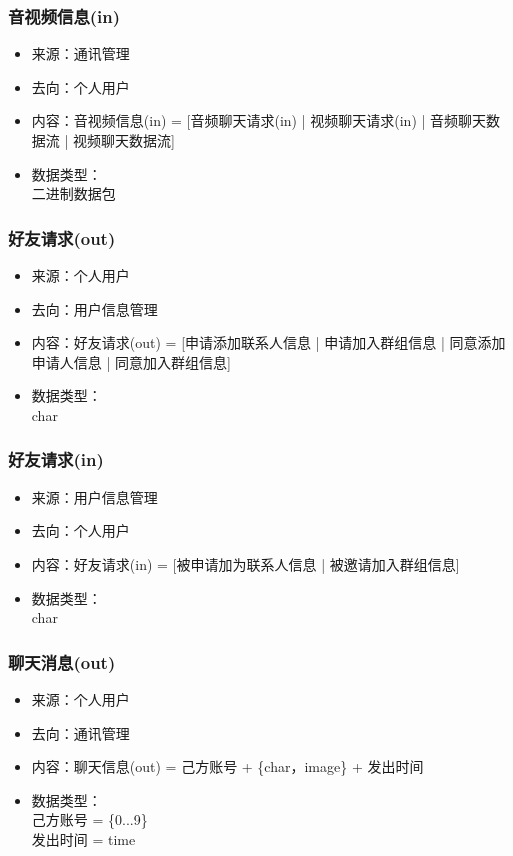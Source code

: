             \subsubsection{音视频信息(in)}
            \begin{itemize}
                    \item 来源：通讯管理
                    \item 去向：个人用户
                    \item 内容：音视频信息(in) = [音频聊天请求(in) | 视频聊天请求(in) | 音频聊天数据流 | 视频聊天数据流]
                    \item 数据类型：\\
                    二进制数据包\\
            \end{itemize}
            \subsubsection{好友请求(out)}
            \begin{itemize}
                \item 来源：个人用户
                \item 去向：用户信息管理
                \item 内容：好友请求(out) = [申请添加联系人信息 | 申请加入群组信息 | 同意添加申请人信息 | 同意加入群组信息]
                \item 数据类型：\\
                {char}
            \end{itemize}
                \subsubsection{好友请求(in)}
                \begin{itemize}
                    \item 来源：用户信息管理
                    \item 去向：个人用户
                    \item 内容：好友请求(in) = [被申请加为联系人信息 | 被邀请加入群组信息]
                    \item 数据类型：\\{char}
            \end{itemize}
            \subsubsection{聊天消息(out)}
            \begin{itemize}
                \item 来源：个人用户
                \item 去向：通讯管理
                \item 内容：聊天信息(out) = 己方账号 + \{char，image\} + 发出时间
                \item 数据类型：\\己方账号 = \{0...9\}\\
                         发出时间 = time
            \end{itemize}
